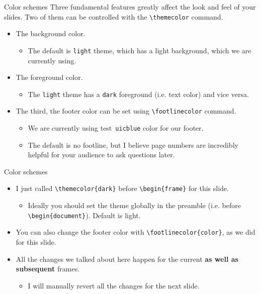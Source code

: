 \documentclass{beamer}
\newcommand{\testcolor}[1]{\colorbox{#1}{\textcolor{#1}{test}}~\texttt{#1}}
\begin{document}
\begin{frame}[fragile]{Color schemes}
Three fundamental features greatly affect the look and feel of your slides. Two of them can be controlled with the \verb|\themecolor| command.
\begin{itemize}
\item The background color.
\begin{itemize}
    \item The default is \verb|light| theme, which has a light background, which we are currently using.
\end{itemize}
\item The foreground color.
\begin{itemize}
    \item The \verb|light| theme has a \verb|dark| foreground (i.e. text color) and vice versa.
\end{itemize}
\item The third, the footer color can be set using \verb|\footlinecolor| command.
\begin{itemize}
    \item We are currently using \testcolor{uicblue} color for our footer.
    \item The default is no footline, but I believe page numbers are incredibly helpful for your audience to ask questions later.
\end{itemize}
\end{itemize}
\end{frame}


\begin{frame}[fragile]{Color schemes}
\begin{itemize}
\item I just called \verb|\themecolor{dark}| before \verb|\begin{frame}| for this slide.
\begin{itemize}
    \item Ideally you should set the theme globally in the preamble (i.e. before \verb|\begin{document}|). Default is light.
\end{itemize}
\item You can also change the footer color with \verb|\footlinecolor{color}|, as we did for this slide.
\item All the changes we talked about here happen for the current \textbf{as well as subsequent} frames.
\begin{itemize}
    \item I will manually revert all the changes for the next slide.
\end{itemize}
\end{itemize}
\end{frame}
\end{document}
